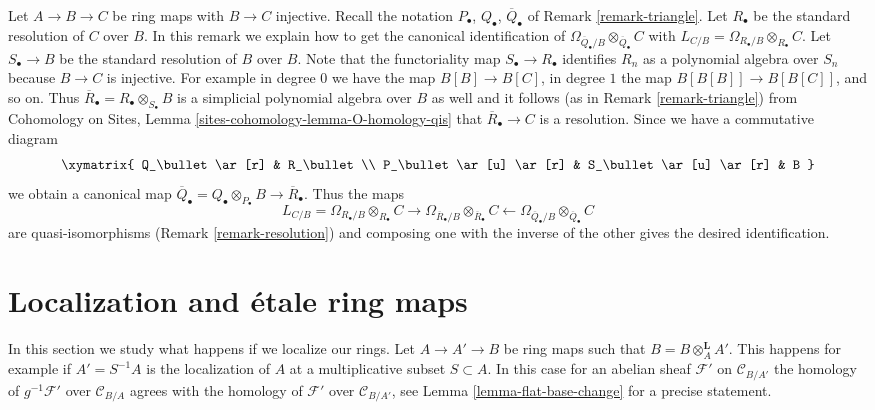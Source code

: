 \begin{remark}
\label{remark-explicit-map}
Let $A \to B \to C$ be ring maps with $B \to C$ injective.
Recall the notation $P_\bullet$, $Q_\bullet$, $\overline{Q}_\bullet$ of
Remark \ref{remark-triangle}.
Let $R_\bullet$ be the standard resolution of $C$ over $B$.
In this remark we explain how to get the canonical identification
of $\Omega_{\overline{Q}_\bullet/B} \otimes_{\overline{Q}_\bullet} C$
with $L_{C/B} = \Omega_{R_\bullet/B} \otimes_{R_\bullet} C$.
Let $S_\bullet \to B$ be the standard resolution of $B$ over $B$.
Note that the functoriality map $S_\bullet \to R_\bullet$ identifies
$R_n$ as a polynomial algebra over $S_n$ because $B \to C$ is injective.
For example in degree $0$ we have the map $B[B] \to B[C]$, in degree
$1$ the map $B[B[B]] \to B[B[C]]$, and so on. Thus
$\overline{R}_\bullet = R_\bullet \otimes_{S_\bullet} B$
is a simplicial polynomial algebra
over $B$ as well and it follows (as in Remark \ref{remark-triangle}) from
Cohomology on Sites, Lemma
\ref{sites-cohomology-lemma-O-homology-qis}
that $\overline{R}_\bullet \to C$ is a resolution. Since we have
a commutative diagram
$$
\xymatrix{
Q_\bullet \ar[r] & R_\bullet \\
P_\bullet \ar[u] \ar[r] & S_\bullet \ar[u] \ar[r] & B
}
$$
we obtain a canonical map
$\overline{Q}_\bullet = Q_\bullet \otimes_{P_\bullet} B \to
\overline{R}_\bullet$. Thus the maps
$$
L_{C/B} = \Omega_{R_\bullet/B} \otimes_{R_\bullet} C
\longrightarrow
\Omega_{\overline{R}_\bullet/B} \otimes_{\overline{R}_\bullet} C
\longleftarrow
\Omega_{\overline{Q}_\bullet/B} \otimes_{\overline{Q}_\bullet} C
$$
are quasi-isomorphisms (Remark \ref{remark-resolution}) and composing
one with the inverse of the other gives the desired identification.
\end{remark}





\section{Localization and \'etale ring maps}
\label{section-localization}

\noindent
In this section we study what happens if we localize our rings.
Let $A \to A' \to B$ be ring maps such that $B = B \otimes_A^\mathbf{L} A'$.
This happens for example if $A' = S^{-1}A$ is the localization of $A$
at a multiplicative subset $S \subset A$. In this
case for an abelian sheaf $\mathcal{F}'$ on $\mathcal{C}_{B/A'}$
the homology of $g^{-1}\mathcal{F}'$ over $\mathcal{C}_{B/A}$ agrees with
the homology of $\mathcal{F}'$ over $\mathcal{C}_{B/A'}$, see
Lemma \ref{lemma-flat-base-change} for a precise statement.

